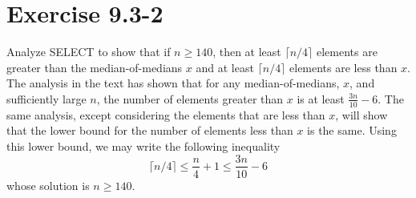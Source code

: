 \documentclass[10pt,a4paper]{article}
\begin{document}
\section*{Exercise 9.3-2}
Analyze SELECT to show that if $n\geq 140$, then at least $\lceil n/4\rceil$ elements are greater than the median-of-medians $x$ and at least $\lceil n/4\rceil$ elements are less than $x$.
\vspace*{\baselineskip}
\\
The analysis in the text has shown that for any median-of-medians, $x$, and sufficiently large $n$, the number of elements greater than $x$ is at least $\frac{3n}{10}-6$. The same analysis, except considering the elements that are less than $x$, will show that the lower bound for the number of elements less than $x$ is the same. Using this lower bound, we may write the following inequality
\begin{equation}
\lceil n/4 \rceil \leq \frac{n}{4} + 1 \leq \frac{3n}{10} - 6
\end{equation}
whose solution is $n\geq 140$.

\end{document}
